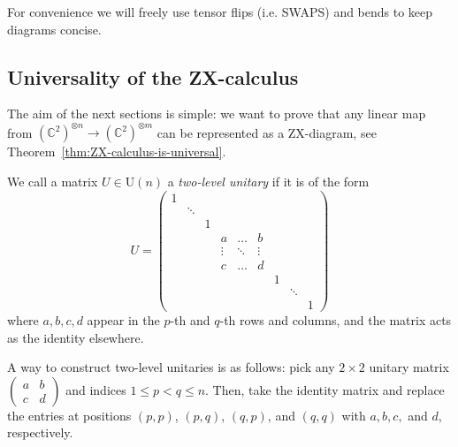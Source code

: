 \documentclass[a4paper, oneside, 12pt]{amsart}
\begin{document}
\begin{convention}
  For convenience we will freely use tensor flips (i.e. SWAPS) and  bends to keep diagrams concise.
\end{convention}

\subsection{Universality of the ZX-calculus}\label{sec:universality-of-zx-calculus}
The aim of the next sections is simple: we want to prove that any linear map from \( (\mathbb{C}^{2})^{\otimes n} \to (\mathbb{C}^{2})^{\otimes m}\) can be represented as a ZX-diagram, see Theorem~\ref{thm:ZX-calculus-is-universal}.

\begin{definition}\label{def:two-level-unitary}
We call a matrix \(U \in \mathrm{U}(n)\) a \emph{two-level unitary} if it is of the form
  \begin{equation*}
    U =
    \begin{pmatrix}
      1 &   &   &   &   &   &   &   &  \\
        & \ddots &   &   &   &   &   &   &  \\
        &   & 1 &   &   &   &   &   &  \\
        &   &   & a & \dots & b &   &   &  \\
        &   &   & \vdots & \ddots & \vdots &   &   &  \\
        &   &   & c & \dots & d &   &   &  \\
        &   &   &   &   &   & 1 &   &  \\
        &   &   &   &   &   &   & \ddots &  \\
        &   &   &   &   &   &   &   & 1
    \end{pmatrix}
  \end{equation*}
  where \(a, b, c, d\) appear in the \(p\)-th and \(q\)-th rows and columns, and the matrix acts as the identity elsewhere.
\end{definition}

A way to construct two-level unitaries is as follows:
pick any \( 2 \times 2 \) unitary matrix \( \begin{pmatrix} a & b \\ c & d \end{pmatrix} \) and indices \( 1 \leq p < q \leq n \). Then, take the identity matrix and replace the entries at positions \( (p,p) \), \( (p,q) \), \( (q,p) \), and \( (q,q) \) with \( a, b, c, \) and \( d \), respectively.
\end{document}
